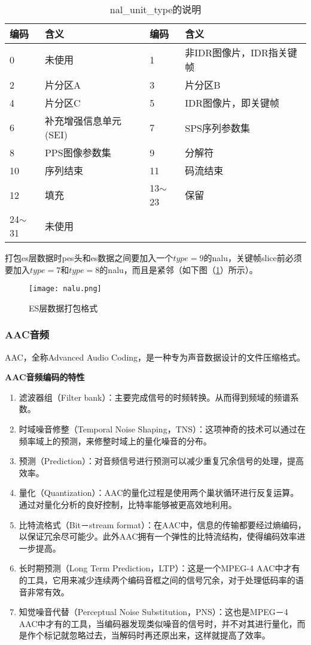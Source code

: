 \documentclass[bachelor]{thesis-uestc}
\begin{document}
\begin{table}[!h]
\centering
\caption{nal\_unit\_type的说明}
\label{nal的说明}
\begin{tabular}{llll}
\toprule
编码 &含义 &编码 &含义 \\
\midrule
0	&未使用 &1	&非IDR图像片，IDR指关键帧\\
2	&片分区A &3	&片分区B\\
4	&片分区C &5	&IDR图像片，即关键帧\\
6	&补充增强信息单元(SEI) &7	&SPS序列参数集\\
8	&PPS图像参数集 &9	&分解符\\
10	&序列结束 &11	&码流结束\\
12	&填充 &13$\sim$23	&保留\\
24$\sim$31	&未使用\\
\bottomrule 
\end{tabular}
\end{table}

打包es层数据时pes头和es数据之间要加入一个$type=9$的nalu，关键帧slice前必须要加入$type=7$和$type=8$的nalu，而且是紧邻（如下图（\ref{nalu}）所示）。

\begin{figure}[h]
\texttt{[image: nalu.png]}	
\caption{ES层数据打包格式}
\label{nalu} 
\end{figure}

\subsubsection{AAC音频}

AAC，全称Advanced Audio Coding，是一种专为声音数据设计的文件压缩格式。

\textbf{AAC音频编码的特性}

\begin{enumerate}
	\item 滤波器组（Filter bank）：主要完成信号的时频转换。从而得到频域的频谱系数。
	\item 时域噪音修整（Temporal Noise Shaping，TNS）：这项神奇的技术可以通过在频率域上的预测，来修整时域上的量化噪音的分布。
	\item 预测（Prediction）：对音频信号进行预测可以减少重复冗余信号的处理，提高效率。
	\item 量化（Quantization）：AAC的量化过程是使用两个巢状循环进行反复运算。通过对量化分析的良好控制，比特率能够被更高效地利用。
	\item 比特流格式（Bit－stream format）：在AAC中，信息的传输都要经过熵编码，以保证冗余尽可能少。此外AAC拥有一个弹性的比特流结构，使得编码效率进一步提高。
	\item 长时期预测（Long Term Prediction，LTP）：这是一个MPEG-4 AAC中才有的工具，它用来减少连续两个编码音框之间的信号冗余，对于处理低码率的语音非常有效。
	\item 知觉噪音代替（Perceptual Noise Substitution，PNS）：这也是MPEG－4 AAC中才有的工具，当编码器发现类似噪音的信号时，并不对其进行量化，而是作个标记就忽略过去，当解码时再还原出来，这样就提高了效率。

\end{enumerate}
\end{document}
